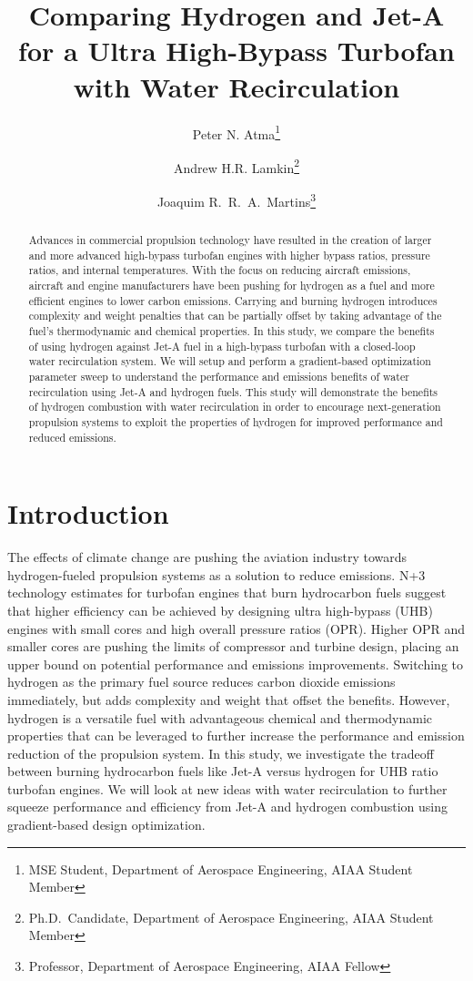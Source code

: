 \documentclass[conf]{new-aiaa}
\title{Comparing Hydrogen and Jet-A for a Ultra High-Bypass Turbofan with Water Recirculation} %
\author{Peter N. Atma\footnote{MSE Student, Department of Aerospace Engineering, AIAA Student Member}}
\author{Andrew H.R. Lamkin\footnote{Ph.D.~Candidate, Department of Aerospace Engineering, AIAA Student Member}}
\author{Joaquim R.~R.~A.~Martins\footnote{Professor, Department of Aerospace Engineering, AIAA Fellow}}
\affil{University of Michigan, Ann Arbor, MI, 48109}
\begin{document}
\maketitle

\begin{abstract}
    Advances in commercial propulsion technology have resulted in the creation of larger and more advanced high-bypass turbofan engines with higher bypass ratios, pressure ratios, and internal temperatures.
    With the focus on reducing aircraft emissions, aircraft and engine manufacturers have been pushing for hydrogen as a fuel and more efficient engines to lower carbon emissions.
    Carrying and burning hydrogen introduces complexity and weight penalties that can be partially offset by taking advantage of the fuel's thermodynamic and chemical properties.
    In this study, we compare the benefits of using hydrogen against Jet-A fuel in a high-bypass turbofan with a closed-loop water recirculation system.
    We will setup and perform a gradient-based optimization parameter sweep to understand the performance and emissions benefits of water recirculation using Jet-A and hydrogen fuels.
    This study will demonstrate the benefits of hydrogen combustion with water recirculation in order to encourage next-generation propulsion systems to exploit the properties of hydrogen for improved performance and reduced emissions.
\end{abstract}

\section{Introduction}
The effects of climate change are pushing the aviation industry towards hydrogen-fueled propulsion systems as a solution to reduce emissions.
N+3 technology estimates for turbofan engines that burn hydrocarbon fuels suggest that higher efficiency can be achieved by designing ultra high-bypass (UHB) engines with small cores and high overall pressure ratios (OPR).
Higher OPR and smaller cores are pushing the limits of compressor and turbine design, placing an upper bound on potential performance and emissions improvements.
Switching to hydrogen as the primary fuel source reduces carbon dioxide emissions immediately, but adds complexity and weight that offset the benefits.
However, hydrogen is a versatile fuel with advantageous chemical and thermodynamic properties that can be leveraged to further increase the performance and emission reduction of the propulsion system.
In this study, we investigate the tradeoff between burning hydrocarbon fuels like Jet-A versus hydrogen for UHB ratio turbofan engines.
We will look at new ideas with water recirculation to further squeeze performance and efficiency from Jet-A and hydrogen combustion using gradient-based design optimization.
\end{document}
